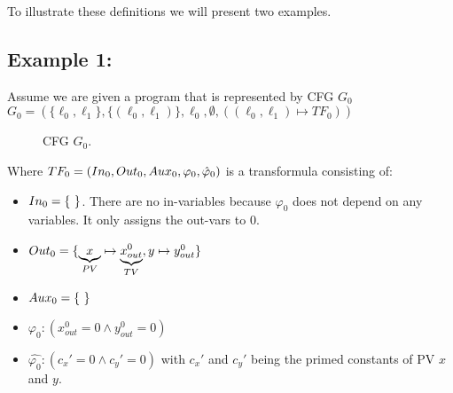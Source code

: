 \documentclass{article}
\newcommand\mycom[1]{}
\newcommand\mycom[1]{#1}
\newcommand{\jw}[1]{\mycom{\todo[color=blue!40,inline]{\small JW: #1}}}
\begin{document}
	To illustrate these definitions we will present two examples.
	
	\medskip
	\jw{How to do this transition beautifully? Just writing $TF_0$ alone is confusing.}
	\subsection*{Example 1:}
	Assume we are given a program that is represented by CFG $G_0$ \\ $G_0 = (\{ \ell_0, \ell_1 \}, \{ (\ell_0, \ell_1)\}, \ell_0, \emptyset, ((\ell_0, \ell_1) 
	\mapsto TF_0))$
	\begin{figure}[h]
		\centering
		\caption{CFG $G_0$.}
	\end{figure}
	
	Where $TF_0 = (In_0, Out_0, Aux_0, \varphi_0, \hat{\varphi}_0)$ is a transformula consisting of: 
	\begin{itemize}
		\item $In_0 = \{\ \}$. There are no in-variables because $\varphi_0$ does not depend on any variables. It only assigns the out-vars to 0.
		\item $Out_0 = \{ \underbrace{x}_{PV} \mapsto \underbrace{x_{out}^0}_{TV}, y \mapsto y_{out}^0\}$
		\item $Aux_0 = \{ \ \} $
		\item $\varphi_0: (x_{out}^0 = 0 \land y_{out}^0 = 0)$
		\item $\hat{\varphi_0}: (c_x' = 0 \land c_y' = 0)$ with $c_x'$ and $c_y'$ being the primed constants of PV $x$ and $y$.
	\end{itemize}
	
	
\end{document}
